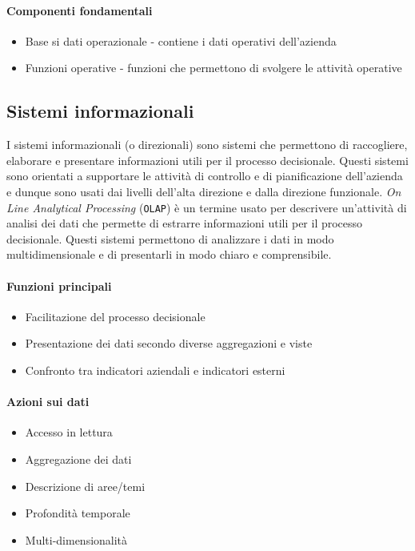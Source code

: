         \paragraph{Componenti fondamentali}
            \begin{itemize}
                \item Base si dati operazionale - contiene i dati operativi dell'azienda
                \item Funzioni operative - funzioni che permettono di svolgere le attività operative
            \end{itemize}
    \subsection{Sistemi informazionali}
        I sistemi informazionali (o direzionali) sono sistemi che permettono di raccogliere, elaborare e presentare informazioni utili per il processo decisionale. Questi sistemi sono orientati a supportare le attività di controllo e di pianificazione dell'azienda e dunque sono usati dai livelli dell'alta direzione e dalla direzione funzionale. 
        \textit{On Line Analytical Processing} (\texttt{OLAP}) è un termine usato per descrivere un'attività di analisi dei dati che permette di estrarre informazioni utili per il processo decisionale. Questi sistemi permettono di analizzare i dati in modo multidimensionale e di presentarli in modo chiaro e comprensibile.
        \paragraph{Funzioni principali}
            \begin{itemize}
                \item Facilitazione del processo decisionale
                \item Presentazione dei dati secondo diverse aggregazioni e viste
                \item Confronto tra indicatori aziendali e indicatori esterni
            \end{itemize}
        \paragraph{Azioni sui dati}
            \begin{itemize}
                \item Accesso in lettura
                \item Aggregazione dei dati
                \item Descrizione di aree/temi
                \item Profondità temporale
                \item Multi-dimensionalità
            \end{itemize}
